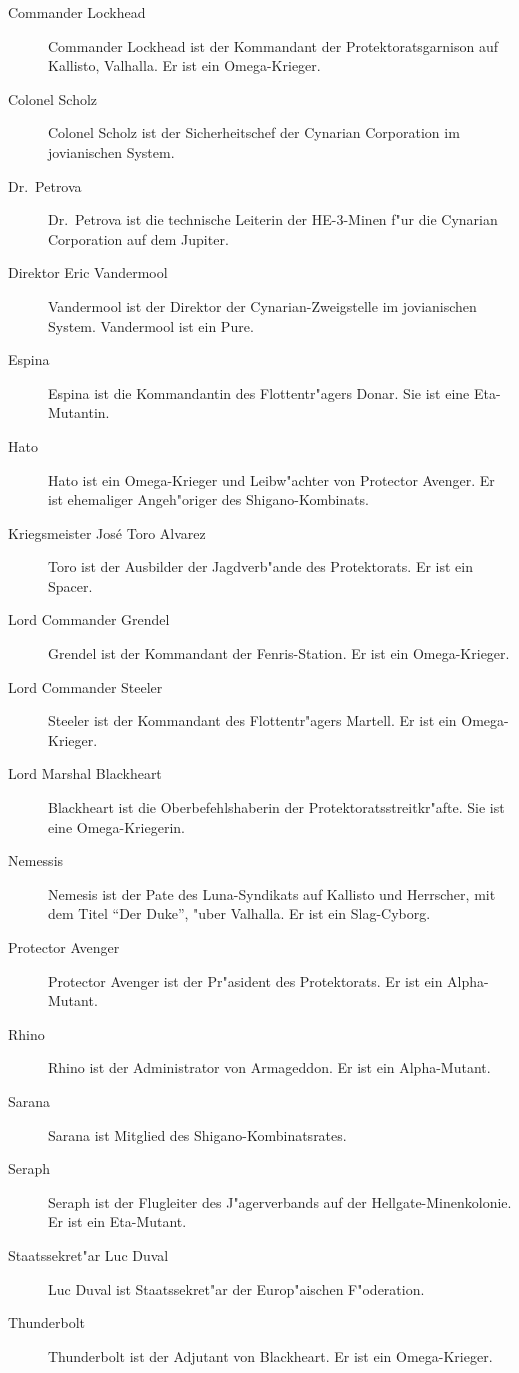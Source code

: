 
\begin{description}
\item [Commander Lockhead] Commander Lockhead ist der Kommandant der Protektoratsgarnison auf Kallisto, Valhalla. Er ist ein Omega-Krieger.
\item [Colonel Scholz] Colonel Scholz ist der Sicherheitschef der Cynarian Corporation im jovianischen System.
\item [Dr.~Petrova] Dr.~Petrova ist die technische Leiterin der HE-3-Minen f"ur die Cynarian Corporation auf dem Jupiter.
\item [Direktor Eric Vandermool]  Vandermool ist der Direktor der Cynarian-Zweigstelle im jovianischen System. Vandermool ist ein Pure.
\item [Espina] Espina ist die Kommandantin des Flottentr"agers Donar. Sie ist eine Eta-Mutantin.
\item [Hato] Hato ist ein Omega-Krieger und Leibw"achter von Protector Avenger. Er ist ehemaliger Angeh"origer des Shigano-Kombinats.
\item [Kriegsmeister Jos\'{e} \frqq{}Toro\flqq{} Alvarez] Toro ist der Ausbilder der Jagdverb"ande des Protektorats. Er ist ein Spacer.
\item [Lord Commander Grendel] Grendel ist der Kommandant der Fenris-Station. Er ist ein Omega-Krieger.
\item [Lord Commander Steeler] Steeler ist der Kommandant des Flottentr"agers Martell. Er ist ein Omega-Krieger.
\item [Lord Marshal Blackheart] Blackheart ist die Oberbefehlshaberin der Protektoratsstreitkr"afte. Sie ist eine Omega-Kriegerin.
\item [Nemessis] Nemesis ist der Pate des Luna-Syndikats auf Kallisto und Herrscher, mit dem Titel ``Der Duke'', "uber Valhalla. Er ist ein 
      Slag-Cyborg. 
\item [Protector Avenger] Protector Avenger ist der Pr"asident des Protektorats. Er ist ein Alpha-Mutant.
\item [Rhino] Rhino ist der Administrator von Armageddon. Er ist ein Alpha-Mutant.
\item [Sarana] Sarana ist Mitglied des Shigano-Kombinatsrates.
\item [Seraph] Seraph ist der Flugleiter des J"agerverbands auf der Hellgate-Minenkolonie. Er ist ein Eta-Mutant.
\item [Staatssekret"ar Luc Duval] Luc Duval ist Staatssekret"ar der Europ"aischen F"oderation.
\item [Thunderbolt] Thunderbolt ist der Adjutant von Blackheart. Er ist ein Omega-Krieger. 
\end{description}
